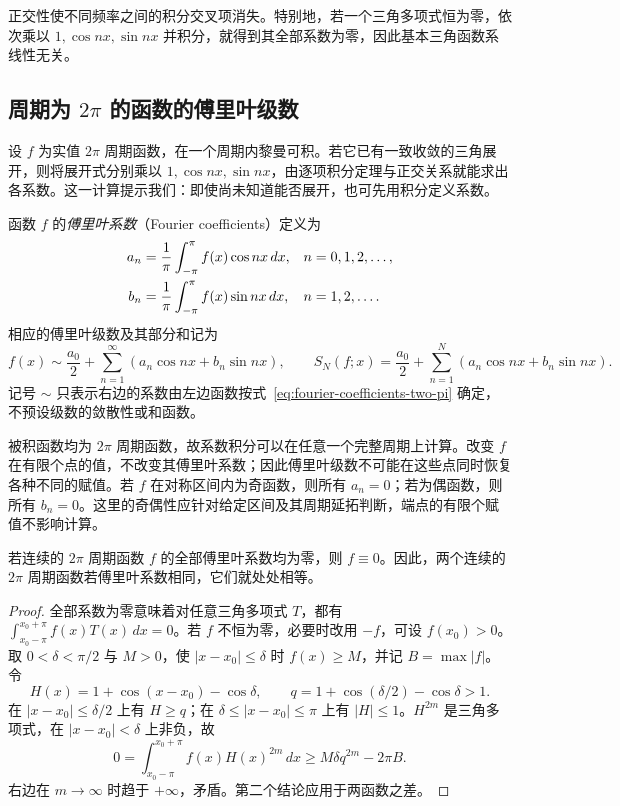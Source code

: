 \documentclass[UTF8,12pt,a4paper,fontset=fandol]{ctexbook}
\begin{document}
正交性使不同频率之间的积分交叉项消失。特别地，若一个三角多项式恒为零，依次乘以 $1,\cos nx,\sin nx$ 并积分，就得到其全部系数为零，因此基本三角函数系线性无关。

\subsection{周期为 \texorpdfstring{$2\pi$}{2pi} 的函数的傅里叶级数}
\label{subsec:fourier-series-of-two-pi-periodic-functions}

设 $f$ 为实值 $2\pi$ 周期函数，在一个周期内黎曼可积。若它已有一致收敛的三角展开，则将展开式分别乘以 $1,\cos nx,\sin nx$，由逐项积分定理与正交关系就能求出各系数。这一计算提示我们：即使尚未知道能否展开，也可先用积分定义系数。

\begin{definition}
\label{def:fourier-coefficients-and-series}
函数 $f$ 的\emph{傅里叶系数}（Fourier coefficients）定义为
\begin{align}
    a_n&=\frac1\pi\int_{-\pi}^{\pi}f(x)\cos nx\,dx,
          &&n=0,1,2,\ldots,\notag\\
    b_n&=\frac1\pi\int_{-\pi}^{\pi}f(x)\sin nx\,dx,
          &&n=1,2,\ldots.
    \label{eq:fourier-coefficients-two-pi}
\end{align}
相应的傅里叶级数及其部分和记为
\begin{equation}
    f(x)\sim\frac{a_0}{2}
          +\sum_{n=1}^\infty(a_n\cos nx+b_n\sin nx),
    \qquad
    S_N(f;x)=\frac{a_0}{2}
          +\sum_{n=1}^N(a_n\cos nx+b_n\sin nx).
    \label{eq:fourier-series-and-partial-sums}
\end{equation}
记号 $\sim$ 只表示右边的系数由左边函数按式~\eqref{eq:fourier-coefficients-two-pi} 确定，不预设级数的敛散性或和函数。
\end{definition}

被积函数均为 $2\pi$ 周期函数，故系数积分可以在任意一个完整周期上计算。改变 $f$ 在有限个点的值，不改变其傅里叶系数；因此傅里叶级数不可能在这些点同时恢复各种不同的赋值。若 $f$ 在对称区间内为奇函数，则所有 $a_n=0$；若为偶函数，则所有 $b_n=0$。这里的奇偶性应针对给定区间及其周期延拓判断，端点的有限个赋值不影响计算。

\begin{theorem}[连续周期函数的傅里叶系数唯一性]
\label{thm:fourier-uniqueness-continuous}
若连续的 $2\pi$ 周期函数 $f$ 的全部傅里叶系数均为零，则 $f\equiv0$。因此，两个连续的 $2\pi$ 周期函数若傅里叶系数相同，它们就处处相等。
\end{theorem}

\begin{proof}
全部系数为零意味着对任意三角多项式 $T$，都有 $\int_{x_0-\pi}^{x_0+\pi}f(x)T(x)\,dx=0$。若 $f$ 不恒为零，必要时改用 $-f$，可设 $f(x_0)>0$。取 $0<\delta<\pi/2$ 与 $M>0$，使 $|x-x_0|\leq\delta$ 时 $f(x)\geq M$，并记 $B=\max|f|$。令
\[
    H(x)=1+\cos(x-x_0)-\cos\delta,
    \qquad q=1+\cos(\delta/2)-\cos\delta>1.
\]
在 $|x-x_0|\leq\delta/2$ 上有 $H\geq q$；在 $\delta\leq|x-x_0|\leq\pi$ 上有 $|H|\leq1$。$H^{2m}$ 是三角多项式，在 $|x-x_0|<\delta$ 上非负，故
\[
    0=\int_{x_0-\pi}^{x_0+\pi}f(x)H(x)^{2m}\,dx
       \geq M\delta q^{2m}-2\pi B.
\]
右边在 $m\to\infty$ 时趋于 $+\infty$，矛盾。第二个结论应用于两函数之差。
\end{proof}
\end{document}
